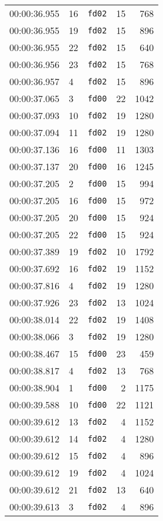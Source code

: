 \documentclass{article}
\begin{document}
\begin{longtable}{lllrr}
00:00:36.955 & 16 & \texttt{fd02} & 15 & 768 \\
00:00:36.955 & 19 & \texttt{fd02} & 15 & 896 \\
00:00:36.955 & 22 & \texttt{fd02} & 15 & 640 \\
00:00:36.956 & 23 & \texttt{fd02} & 15 & 768 \\
00:00:36.957 & 4 & \texttt{fd02} & 15 & 896 \\
00:00:37.065 & 3 & \texttt{fd00} & 22 & 1042 \\
00:00:37.093 & 10 & \texttt{fd02} & 19 & 1280 \\
00:00:37.094 & 11 & \texttt{fd02} & 19 & 1280 \\
00:00:37.136 & 16 & \texttt{fd00} & 11 & 1303 \\
00:00:37.137 & 20 & \texttt{fd00} & 16 & 1245 \\
00:00:37.205 & 2 & \texttt{fd00} & 15 & 994 \\
00:00:37.205 & 16 & \texttt{fd00} & 15 & 972 \\
00:00:37.205 & 20 & \texttt{fd00} & 15 & 924 \\
00:00:37.205 & 22 & \texttt{fd00} & 15 & 924 \\
00:00:37.389 & 19 & \texttt{fd02} & 10 & 1792 \\
00:00:37.692 & 16 & \texttt{fd02} & 19 & 1152 \\
00:00:37.816 & 4 & \texttt{fd02} & 19 & 1280 \\
00:00:37.926 & 23 & \texttt{fd02} & 13 & 1024 \\
00:00:38.014 & 22 & \texttt{fd02} & 19 & 1408 \\
00:00:38.066 & 3 & \texttt{fd02} & 19 & 1280 \\
00:00:38.467 & 15 & \texttt{fd00} & 23 & 459 \\
00:00:38.817 & 4 & \texttt{fd02} & 13 & 768 \\
00:00:38.904 & 1 & \texttt{fd00} & 2 & 1175 \\
00:00:39.588 & 10 & \texttt{fd00} & 22 & 1121 \\
00:00:39.612 & 13 & \texttt{fd02} & 4 & 1152 \\
00:00:39.612 & 14 & \texttt{fd02} & 4 & 1280 \\
00:00:39.612 & 15 & \texttt{fd02} & 4 & 896 \\
00:00:39.612 & 19 & \texttt{fd02} & 4 & 1024 \\
00:00:39.612 & 21 & \texttt{fd02} & 13 & 640 \\
00:00:39.613 & 3 & \texttt{fd02} & 4 & 896 \\

\end{longtable}
\end{document}
